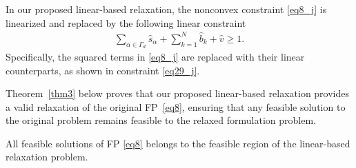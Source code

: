 \documentclass[smallextended,referee,envcountsect,,numbers]{svjour3}
\begin{document}
In our proposed linear-based relaxation, the nonconvex constraint \eqref{eq8_j} is linearized and replaced by the following linear constraint 
\begin{align} \label{eq29_j}
\sum_{\alpha \in \Gamma_d} \hat{s}_\alpha + \sum_{k=1}^N \hat{b}_k + \hat{v} \ge 1. 
\end{align}
Specifically, the squared terms in \eqref{eq8_j} are replaced with their linear counterparts, as shown in constraint \eqref{eq29_j}. 

Theorem~\ref{thm3} below proves that our proposed linear-based relaxation provides a valid relaxation of the original FP~\eqref{eq8}, ensuring that any feasible solution to the original problem remains feasible to the relaxed formulation problem. 
\begin{theorem} \label{thm3}
	All feasible solutions of FP \eqref{eq8} belongs to the feasible region of the linear-based relaxation problem.
\end{theorem}
\end{document}
